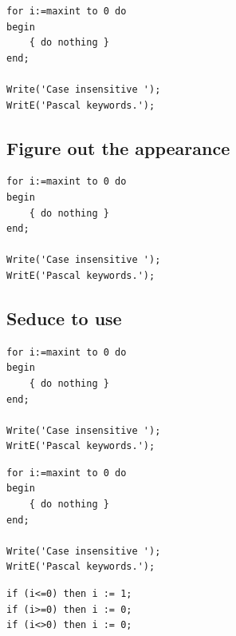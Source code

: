 \documentclass{article}
\begin{document}
{\lstset{frame=bottomline,framesep=0pt}
\begin{lstlisting}[firstline=2,
                    lastline=5]
for i:=maxint to 0 do
begin
    { do nothing }
end;

Write('Case insensitive ');
WritE('Pascal keywords.');
\end{lstlisting}}



\subsection{Figure out the appearance}
{     %
\begin{lstlisting}
for i:=maxint to 0 do
begin
    { do nothing }
end;

Write('Case insensitive ');
WritE('Pascal keywords.');
\end{lstlisting}}

\subsection{Seduce to use}\label{gSeduceToUse}
{\lstset{numbers=left, numberstyle=\tiny, stepnumber=2, numbersep=5pt}
\begin{lstlisting}
for i:=maxint to 0 do
begin
    { do nothing }
end;

Write('Case insensitive ');
WritE('Pascal keywords.');
\end{lstlisting}}

{\lstset{frame=tb}
\begin{lstlisting}[float,caption=A floating example]
for i:=maxint to 0 do
begin
    { do nothing }
end;

Write('Case insensitive ');
WritE('Pascal keywords.');
\end{lstlisting}}

{
\begin{lstlisting}
if (i<=0) then i := 1;
if (i>=0) then i := 0;
if (i<>0) then i := 0;
\end{lstlisting}}
\end{document}
